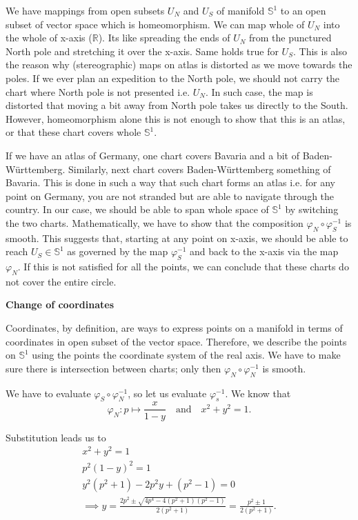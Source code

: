 \documentclass{article}
\begin{document}
\begin{enumerate}[start=13]
\begin{enumerate}
\begin{ans_box}
      We have mappings from open subsets $U_{N}$ and $U_{S}$ of manifold $\mathbb{S}^{1}$ to an open subset of vector space which is homeomorphism. We can map whole of $U_{N}$ into the whole of x-axis ($\mathbb{R}$).  Its like spreading the ends of $U_{N}$ from the punctured North pole and stretching it over the x-axis. Same holds true for $U_{S}$. This is also the reason why (stereographic) maps on atlas is distorted as we move towards the poles. If we ever plan an expedition to the North pole, we should not carry the chart where North pole is not presented i.e. $U_{N}$. In such case, the map is distorted that moving a bit away from North pole takes us directly to the South. However, homeomorphism alone this is not enough to show that this is an atlas, or that these chart covers whole $\mathbb{S}^{1}$.\medskip

      If we have an atlas of Germany, one chart covers Bavaria and a bit of Baden-Württemberg. Similarly, next chart covers Baden-Württemberg something of Bavaria. This is done in such a way that such chart forms an atlas i.e. for any point on Germany, you are not stranded but are able to navigate through the country. In our case, we should be able to span whole space of $\mathbb{S}^{1}$ by switching the two charts. Mathematically, we have to show that the composition $\varphi_{N}\circ\varphi_{S}^{-1}$ is smooth. This suggests that, starting at any point on x-axis, we should be able to reach $U_{S}\in\mathbb{S}^{1}$ as governed by the map $\varphi_{S}^{-1}$ and back to the x-axis via the map $\varphi_{N}$. If this is not satisfied for all the points, we can conclude that these charts do not cover the entire circle.\medskip

      \textbf{Change of coordinates}\medskip

      Coordinates, by definition, are ways to express points on a manifold in terms of coordinates in open subset of the vector space. Therefore, we describe the points on $\mathbb{S}^{1}$ using the points the coordinate system of the real axis. We have to make sure there is intersection between charts; only then $\varphi_{N}\circ\varphi_{N}^{-1}$ is smooth.\medskip

      We have to evaluate $\varphi_{S}\circ\varphi_{N}^{-1}$, so let us evaluate $\varphi_{s}^{-1}$. We know that
      $$
      \varphi_{N}:p\mapsto\frac{x}{1-y}\quad\text{and}\quad x^{2}+y^{2}=1.
      $$

      Substitution leads us to
      \begin{equation*}
        \begin{split}
          x^{2}+y^{2}=1\\
          p^{2}(1-y)^{2}=1\\
          y^{2}(p^{2}+1)-2p^{2}y+(p^{2}-1)=0\\
          \implies y=\frac{2p^{2}\pm\sqrt{4p^{4}-4(p^{2}+1)(p^{2}-1)}}{2(p^{2}+1)}=\frac{p^{2}\pm1}{2(p^{2}+1)}.
        \end{split}
      \end{equation*}


\end{ans_box}
\end{enumerate}
\end{enumerate}
\end{document}
